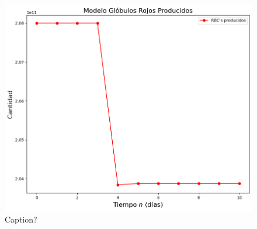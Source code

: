 \begin{figure}[H]
    \centering
    \includegraphics[scale=0.57]{figures/HemoLeveG1SC.png}
    \caption{Caption?}
    \label{sec:variaciones:fig:HemoLeveG1SC}
\end{figure}
